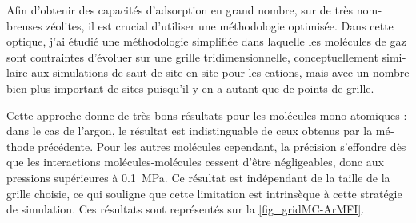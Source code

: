 \documentclass[thesis]{subfiles}
\begin{document}
\begin{otherlanguage}{french}
Afin d'obtenir des capacités d'adsorption en grand nombre, sur de très nombreuses zéolites, il est crucial d'utiliser une méthodologie optimisée. Dans cette optique, j'ai étudié une méthodologie simplifiée dans laquelle les molécules de gaz sont contraintes d'évoluer sur une grille tridimensionnelle, conceptuellement similaire aux simulations de saut de site en site pour les cations, mais avec un nombre bien plus important de sites puisqu'il y en a autant que de points de grille.

Cette approche donne de très bons résultats pour les molécules mono-atomiques : dans le cas de l'argon, le résultat est indistinguable de ceux obtenus par la méthode précédente. Pour les autres molécules cependant, la précision s'effondre dès que les interactions molécules-molécules cessent d'être négligeables, donc aux pressions supérieures à \qty{0.1}{MPa}. Ce résultat est indépendant de la taille de la grille choisie, ce qui souligne que cette limitation est intrinsèque à cette stratégie de simulation. Ces résultats sont représentés sur la \cref{fig_gridMC-ArMFI}.


\end{otherlanguage}
\end{document}
